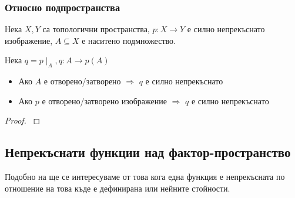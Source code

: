 \subsubsection{Относно подпространства}
\begin{theorem}
    Нека $X, Y$ са топологични пространства, $p: X \to Y$ е силно непрекъснато изображение, $A \subseteq X$ е наситено подмножество. 

    Нека $q = p\mid_A, q: A \to p(A)$
    \begin{itemize}
        \item Ако $A$ е отворено/затворено $\Rightarrow$ $q$ е силно непрекъснато
        \item Ако $p$ е отворено/затворено изображение $\Rightarrow$ $q$ е силно непрекъснато
    \end{itemize}
\end{theorem}
\begin{proof}
    \cite[стр.~140]{munkrestopology}
\end{proof}

\subsection{Непрекъснати функции над фактор-пространство}

Подобно на  ще се интересуваме от това кога една функция е непрекъсната по отношение на това къде е дефинирана или нейните стойности.


